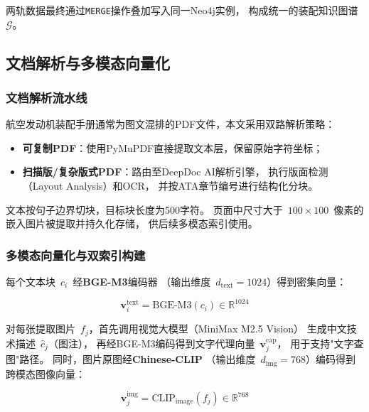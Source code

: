两轨数据最终通过\texttt{MERGE}操作叠加写入同一Neo4j实例，
构成统一的装配知识图谱~$\mathcal{G}$。

\subsection{文档解析与多模态向量化}
\label{sec:index}

\subsubsection{文档解析流水线}
\label{sec:parse}

航空发动机装配手册通常为图文混排的PDF文件，本文采用双路解析策略：
\begin{itemize}
  \item \textbf{可复制PDF}：使用PyMuPDF直接提取文本层，保留原始字符坐标；
  \item \textbf{扫描版/复杂版式PDF}：路由至DeepDoc AI解析引擎，
        执行版面检测（Layout Analysis）和OCR，
        并按ATA章节编号进行结构化分块。
\end{itemize}

文本按句子边界切块，目标块长度为500字符。
页面中尺寸大于~$100 \times 100$~像素的嵌入图片被提取并持久化存储，
供后续多模态索引使用。

\subsubsection{多模态向量化与双索引构建}
\label{sec:vectorize}

每个文本块~$c_i$~经\textbf{BGE-M3}编码器
（输出维度~$d_{\text{text}} = 1024$）得到密集向量：

\begin{equation}
  \mathbf{v}_i^{\text{text}} = \text{BGE-M3}(c_i) \in \mathbb{R}^{1024}
  \label{eq:text-vec}
\end{equation}

对每张提取图片~$f_j$，首先调用视觉大模型（MiniMax M2.5 Vision）
生成中文技术描述~$\hat{c}_j$（图注），
再经BGE-M3编码得到文字代理向量~$\mathbf{v}_j^{\text{cap}}$，
用于支持"文字查图"路径。
同时，图片原图经\textbf{Chinese-CLIP}
（输出维度~$d_{\text{img}} = 768$）编码得到跨模态图像向量：

\begin{equation}
  \mathbf{v}_j^{\text{img}} = \text{CLIP}_{\text{image}}(f_j) \in \mathbb{R}^{768}
  \label{eq:img-vec}
\end{equation}


